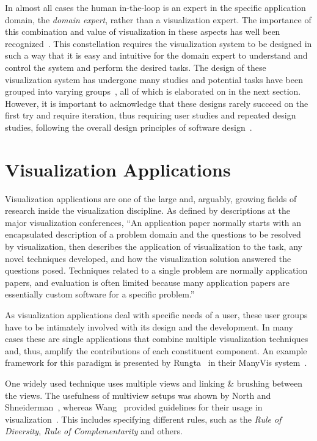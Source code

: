 In almost all cases the human in-the-loop is an expert in the specific application domain, the \emph{domain expert}, rather than a visualization expert.  The importance of this combination and value of visualization in these aspects has well been recognized~\cite{van2005value}.  This constellation requires the visualization system to be designed in such a way that it is easy and intuitive for the domain expert to understand and control the system and perform the desired tasks.  The design of these visualization system has undergone many studies and potential tasks have been grouped into varying groups~\cite{brehmer2014visualizing}, all of which is elaborated on in the next section.  However, it is important to acknowledge that these designs rarely succeed on the first try and require iteration, thus requiring user studies and repeated design studies, following the overall design principles of software design~\cite{victor2003iterative}.



\section{Visualization Applications} \label{cha:intro:appl}
Visualization applications are one of the large and, arguably, growing fields of research inside the visualization discipline.  As defined by descriptions at the major visualization conferences, ``An application paper normally starts with an encapsulated description of a problem domain and the questions to be resolved by visualization, then describes the application of visualization to the task, any novel techniques developed, and how the visualization solution answered the questions posed. Techniques related to a single problem are normally application papers, and evaluation is often limited because many application papers are essentially custom software for a specific problem.''

As visualization applications deal with specific needs of a user, these user groups have to be intimately involved with its design and the development.  In many cases these are single applications that combine multiple visualization techniques and, thus, amplify the contributions of each constituent component.  An example framework for this paradigm is presented by Rungta \etal\ in their ManyVis system~\cite{rungta2013manyvis}.

One widely used technique uses multiple views and linking \& brushing between the views.  The usefulness of multiview setups was shown by North and Shneiderman~\cite{north1997taxonomy}, whereas Wang \etal\ provided guidelines for their usage in visualization~\cite{wang2000guidelines}.  This includes specifying different rules, such as the \emph{Rule of Diversity}, \emph{Rule of Complementarity} and others.



